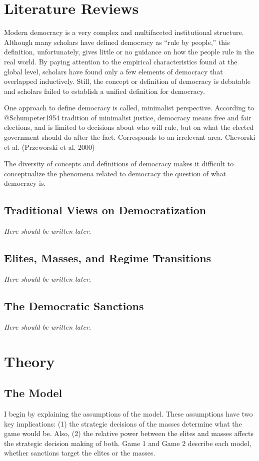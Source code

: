 \documentclass[11pt, letterpage]{article}
\begin{document}
\section*{Literature Reviews}	
Modern democracy is a very complex and multifaceted institutional structure. Although many scholars have defined democracy as “rule by people,” this definition, unfortunately, gives little or no guidance on how the people rule in the real world. By paying attention to the empirical characteristics found at the global level, scholars have found only a few elements of democracy that overlapped inductively. Still, the concept or definition of democracy is debatable and scholars failed to establish a unified definition for democracy.

One approach to define democracy is called, minimalist perspective. According to @Schumpeter1954 tradition of minimalist justice, democracy means free and fair elections, and is limited to decisions about who will rule, but on what the elected government should do after the fact. Corresponds to an irrelevant area. Chevorski et al. (Przeworski et al. 2000)



The diversity of concepts and definitions of democracy makes it difficult to conceptualize the phenomena related to democracy the question of what democracy is. 

\subsection*{Traditional Views on Democratization}
\textit{Here should be written later.}

\subsection*{Elites, Masses, and Regime Transitions}
\textit{Here should be written later.}

\subsection*{The Democratic Sanctions}
\textit{Here should be written later.}

\section*{Theory}
\subsection*{The Model}
I begin by explaining the assumptions of the model. These assumptions have two key implications: (1) the strategic decisions of the masses determine what the game would be. Also, (2) the relative power between the elites and masses affects the strategic decision making of both. Game 1 and Game 2 describe each model, whether sanctions target the elites or the masses.
	
\end{document}
